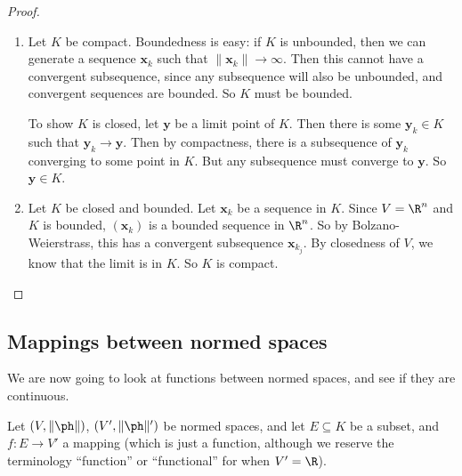\documentclass[a4paper]{article}
\begin{document}
\begin{proof}\leavevmode
  \begin{enumerate}
    \item Let $K$ be compact. Boundedness is easy: if $K$ is unbounded, then we can generate a sequence $\mathbf{x}_k$ such that $\|\mathbf{x}_k\| \to \infty$. Then this cannot have a convergent subsequence, since any subsequence will also be unbounded, and convergent sequences are bounded. So $K$ must be bounded.

      To show $K$ is closed, let $\mathbf{y}$ be a limit point of $K$. Then there is some $\mathbf{y}_k \in K$ such that $\mathbf{y}_k \to \mathbf{y}$. Then by compactness, there is a subsequence of $\mathbf{y}_k$ converging to some point in $K$. But any subsequence must converge to $\mathbf{y}$. So $\mathbf{y} \in K$.

    \item Let $K$ be closed and bounded. Let $\mathbf{x}_k$ be a sequence in $K$. Since $V = \R^n$ and $K$ is bounded, $(\mathbf{x}_k)$ is a bounded sequence in $\R^n$. So by Bolzano-Weierstrass, this has a convergent subsequence $\mathbf{x}_{k_j}$. By closedness of $V$, we know that the limit is in $K$. So $K$ is compact.
  \end{enumerate}
\end{proof}

\subsection{Mappings between normed spaces}
We are now going to look at functions between normed spaces, and see if they are continuous.

Let $(V, \|\ph\|)$, $(V', \|\ph\|')$ be normed spaces, and let $E \subseteq K$ be a subset, and $f: E \to V'$ a mapping (which is just a function, although we reserve the terminology ``function'' or ``functional'' for when $V' = \R$).
\end{document}
